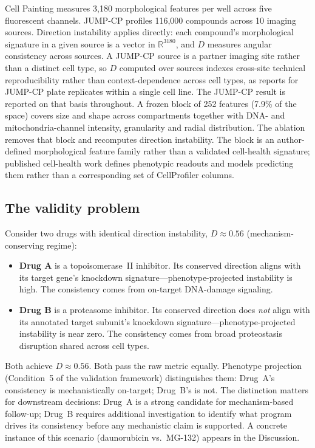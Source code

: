 \documentclass[11pt]{article}
\begin{document}
Cell Painting \citep{bray2016cell,chandrasekaran2023jump} measures 3{,}180 morphological
features per well across five fluorescent channels. JUMP-CP
profiles 116{,}000 compounds across 10 imaging sources. Direction
instability applies directly: each compound's morphological signature in a
given source is a vector in $\mathbb{R}^{3180}$, and $D$ measures angular
consistency across sources. A JUMP-CP source is a partner imaging site
rather than a distinct cell type, so $D$ computed over sources indexes
cross-site technical reproducibility rather than context-dependence across
cell types, as \citet{tower2026atlas} reports for JUMP-CP plate replicates
within a single cell line. The JUMP-CP result is reported on that basis
throughout. A frozen block of
252 features (7.9\% of the space) covers size and shape across compartments
together with DNA- and mitochondria-channel intensity, granularity and
radial distribution. The ablation removes that block and recomputes
direction instability. The block is an author-defined morphological feature
family rather than a validated cell-health signature; published cell-health
work defines phenotypic readouts and models predicting them rather than a
corresponding set of CellProfiler columns.

\subsection{The validity problem}

Consider two drugs with identical direction instability, $D \approx 0.56$
(mechanism-conserving regime):

\begin{itemize}
  \item \textbf{Drug A} is a topoisomerase~II inhibitor. Its conserved
    direction aligns with its target gene's knockdown
    signature---phenotype-projected instability is high. The consistency comes
    from on-target DNA-damage signaling.
  \item \textbf{Drug B} is a proteasome inhibitor. Its conserved direction
    does \emph{not} align with its annotated target subunit's knockdown
    signature---phenotype-projected instability is near zero. The consistency
    comes from broad proteostasis disruption shared across cell types.
\end{itemize}

Both achieve $D \approx 0.56$. Both pass the raw metric equally. Phenotype
projection (Condition~5 of the validation framework) distinguishes them: Drug~A's
consistency is mechanistically on-target; Drug~B's is not. The distinction
matters for downstream decisions: Drug~A is a strong candidate for
mechanism-based follow-up; Drug~B requires additional investigation to
identify what program drives its consistency before any mechanistic claim
is supported. A concrete instance of this scenario (daunorubicin vs.\
MG-132) appears in the Discussion.
\end{document}
